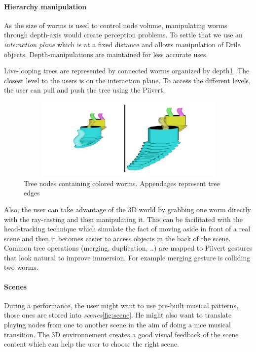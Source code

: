 \paragraph{Hierarchy manipulation}  
As the size of worms is used to control node volume, manipulating worms through depth-axis would create perception problems. To settle that we use an \textit{interaction plane} which is at a fixed distance and allows manipulation of Drile objects. Depth-manipulations are maintained for less accurate uses.

Live-looping trees are represented by connected worms organized by depth\ref{fig:worm}. The closest level to the users is on the interaction plane.
To access the different levels, the user can pull and push the tree using the Piivert.

\begin{figure}[h!]
\centering\includegraphics[width=14cm,height=4cm]{image/worm.jpg}
\caption{Tree nodes containing colored worms. Appendages represent tree edges}
\label{fig:worm}
\end{figure} 

 Also, the user can take advantage of the 3D world by grabbing one worm directly with the ray-casting and then manipulating it. This can be facilitated with the head-tracking technique which simulate the fact of moving aside in front of a real scene and then it becomes easier to access objects in the back of the scene. 
 Common tree operations (merging, duplication, ..) are mapped to Piivert gestures that look natural to improve immersion. For example merging gesture is colliding two worms.

\paragraph{Scenes}  

During a performance, the user might want to use pre-built musical patterns, those ones are stored into \textit{scenes}\ref{fig:scene}. He might also want to translate playing nodes from one to another scene in the aim of doing a nice musical transition. The 3D environnement creates a good visual feedback of the scene content which can help the user to choose the right scene.


